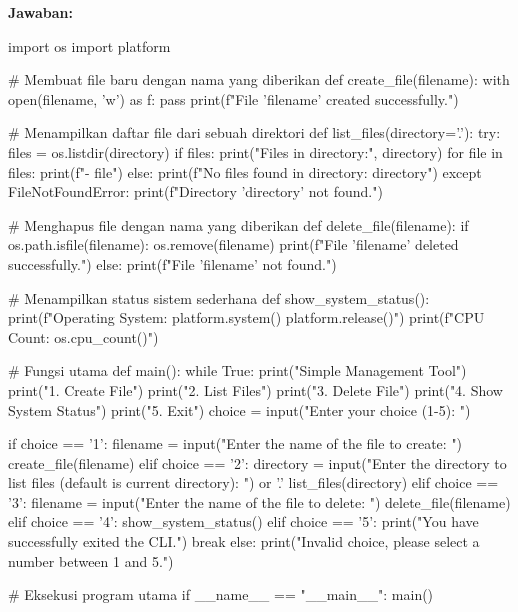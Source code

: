 \documentclass[12pt]{article}
\begin{document}
\noindent \textbf{Jawaban: }
\begin{python}
import os
import platform

# Membuat file baru dengan nama yang diberikan
def create_file(filename):
    with open(filename, 'w') as f:
        pass
    print(f"File '{filename}' created successfully.")

# Menampilkan daftar file dari sebuah direktori
def list_files(directory='.'):
    try:
        files = os.listdir(directory)
        if files:
            print("Files in directory:", directory)
            for file in files:
                print(f"- {file}")
        else:
            print(f"No files found in directory: {directory}")
    except FileNotFoundError:
        print(f"Directory '{directory}' not found.")

# Menghapus file dengan nama yang diberikan
def delete_file(filename):
    if os.path.isfile(filename):
        os.remove(filename)
        print(f"File '{filename}' deleted successfully.")
    else:
        print(f"File '{filename}' not found.")

# Menampilkan status sistem sederhana
def show_system_status():
    print(f"Operating System: {platform.system()} {platform.release()}")
    print(f"CPU Count: {os.cpu_count()}")

# Fungsi utama
def main():
    while True:
        print("\nCLI Simple Management Tool")
        print("1. Create File")
        print("2. List Files")
        print("3. Delete File")
        print("4. Show System Status")
        print("5. Exit")
        choice = input("Enter your choice (1-5): ")

        if choice == '1':
            filename = input("Enter the name of the file to create: ")
            create_file(filename)
        elif choice == '2':
            directory = input("Enter the directory to list files (default is current directory): ") or '.'
            list_files(directory)
        elif choice == '3':
            filename = input("Enter the name of the file to delete: ")
            delete_file(filename)
        elif choice == '4':
            show_system_status()
        elif choice == '5':
            print("You have successfully exited the CLI.")
            break
        else:
            print("Invalid choice, please select a number between 1 and 5.")

# Eksekusi program utama
if __name__ == "__main__":
    main()
\end{python}
\end{document}
